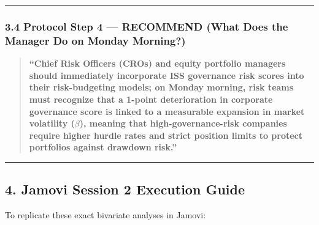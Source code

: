 \documentclass[
]{article}
\begin{document}
\begin{center}\rule{0.5\linewidth}{0.5pt}\end{center}

\subsubsection{3.4 Protocol Step 4 --- RECOMMEND (What Does the Manager
Do on Monday
Morning?)}\label{protocol-step-4-recommend-what-does-the-manager-do-on-monday-morning-1}

\begin{quote}
\textbf{``Chief Risk Officers (CROs) and equity portfolio managers
should immediately incorporate ISS governance risk scores into their
risk-budgeting models; on Monday morning, risk teams must recognize that
a 1-point deterioration in corporate governance score is linked to a
measurable expansion in market volatility (\(\beta\)), meaning that
high-governance-risk companies require higher hurdle rates and strict
position limits to protect portfolios against drawdown risk.''}
\end{quote}

\begin{center}\rule{0.5\linewidth}{0.5pt}\end{center}

\subsection{4. Jamovi Session 2 Execution
Guide}\label{jamovi-session-2-execution-guide}

To replicate these exact bivariate analyses in Jamovi:
\end{document}
